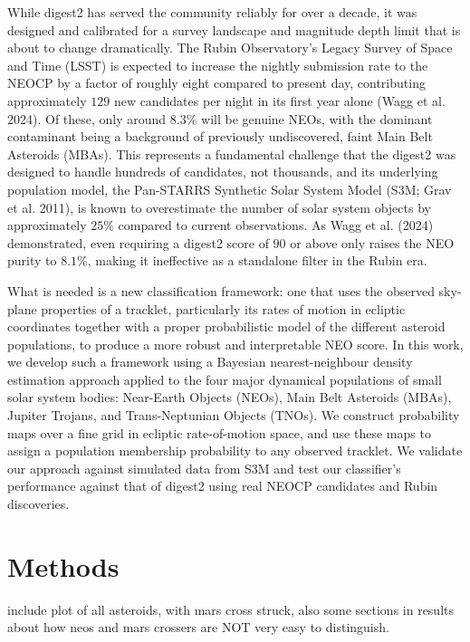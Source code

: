 \documentclass[linenumbers,trackchanges,twocolumn]{aastex701}
\begin{document}
While digest2 has served the community reliably for over a decade, it was designed and calibrated for a survey landscape and magnitude depth limit that is about to change dramatically. The Rubin Observatory’s Legacy Survey of Space and Time (LSST) is expected to increase the nightly submission rate to the NEOCP by a factor of roughly eight compared to present day, contributing approximately \( 129 \) new candidates per night in its first year alone (Wagg et al. 2024). Of these, only around \( 8.3\% \) will be genuine NEOs, with the dominant contaminant being a background of previously undiscovered, faint Main Belt Asteroids (MBAs). This represents a fundamental challenge that the digest2 was designed to handle hundreds of candidates, not thousands, and its underlying population model, the Pan-STARRS Synthetic Solar System Model (S3M; Grav et al. 2011), is known to overestimate the number of solar system objects by approximately \( 25\% \) compared to current observations. As Wagg et al. (2024) demonstrated, even requiring a digest2 score of \( 90 \) or above only raises the NEO purity to \( 8.1\% \), making it ineffective as a standalone filter in the Rubin era.

What is needed is a new classification framework: one that uses the observed sky-plane properties of a tracklet, particularly its rates of motion in ecliptic coordinates together with a proper probabilistic model of the different asteroid populations, to produce a more robust and interpretable NEO score. In this work, we develop such a framework using a Bayesian nearest-neighbour density estimation approach applied to the four major dynamical populations of small solar system bodies: Near-Earth Objects (NEOs), Main Belt Asteroids (MBAs), Jupiter Trojans, and Trans-Neptunian Objects (TNOs). We construct probability maps over a fine grid in ecliptic rate-of-motion space, and use these maps to assign a population membership probability to any observed tracklet. We validate our approach against simulated data from S3M and test our classifier's performance against that of digest2 using real NEOCP candidates and Rubin discoveries.





\section{Methods}

\label{sec:methods}

include plot of all asteroids, with mars cross struck, also some sections in results about how neos and mars crossers are NOT very easy to distinguish. 
\end{document}

